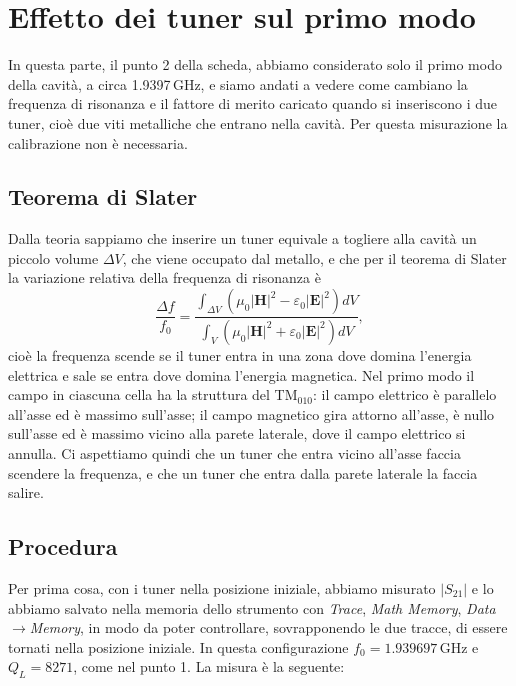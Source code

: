 \documentclass[11pt,a4paper,oneside]{book}
\begin{document}
\chapter{Effetto dei tuner sul primo modo}
\label{cap:tuner}

In questa parte, il punto 2 della scheda, abbiamo considerato solo il primo modo della cavità, a circa 1.9397\,GHz, e siamo andati a vedere come cambiano la frequenza di risonanza e il fattore di merito caricato quando si inseriscono i due tuner, cioè due viti metalliche che entrano nella cavità. Per questa misurazione la calibrazione non è necessaria.

\section{Teorema di Slater}
Dalla teoria sappiamo che inserire un tuner equivale a togliere alla cavità un piccolo volume $\Delta V$, che viene occupato dal metallo, e che per il teorema di Slater la variazione relativa della frequenza di risonanza è
\begin{equation}
\frac{\Delta f}{f_0}=\frac{\int_{\Delta V}\left(\mu_0|\mathbf H|^2-\varepsilon_0|\mathbf E|^2\right)dV}{\int_{V}\left(\mu_0|\mathbf H|^2+\varepsilon_0|\mathbf E|^2\right)dV},
\label{eq:slater}
\end{equation}
cioè la frequenza scende se il tuner entra in una zona dove domina l'energia elettrica e sale se entra dove domina l'energia magnetica. Nel primo modo il campo in ciascuna cella ha la struttura del TM$_{010}$: il campo elettrico è parallelo all'asse ed è massimo sull'asse; il campo magnetico gira attorno all'asse, è nullo sull'asse ed è massimo vicino alla parete laterale, dove il campo elettrico si annulla. Ci aspettiamo quindi che un tuner che entra vicino all'asse faccia scendere la frequenza, e che un tuner che entra dalla parete laterale la faccia salire.

\section{Procedura}
Per prima cosa, con i tuner nella posizione iniziale, abbiamo misurato $|S_{21}|$ e lo abbiamo salvato nella memoria dello strumento con \emph{Trace}, \emph{Math Memory}, \emph{Data}$\rightarrow$\emph{Memory}, in modo da poter controllare, sovrapponendo le due tracce, di essere tornati nella posizione iniziale. In questa configurazione $f_0=1.939697$\,GHz e $Q_L=8271$, come nel punto 1. La misura è la seguente:
\end{document}
